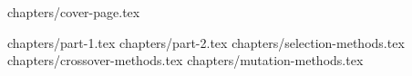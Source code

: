 \documentclass[a4paper,12pt]{article}
\begin{document}


{chapters/cover-page.tex}

\tableofcontents
\clearpage

{chapters/part-1.tex}
{chapters/part-2.tex}
{chapters/selection-methods.tex}
{chapters/crossover-methods.tex}
{chapters/mutation-methods.tex}
\end{document}
